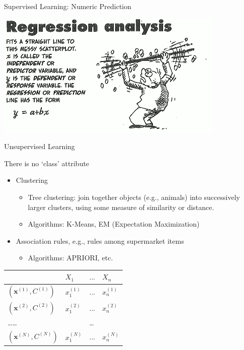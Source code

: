 \documentclass{beamer}
\begin{document}
\begin{frame}{Supervised Learning: Numeric Prediction}

\begin{center}
\includegraphics[width=.9\textwidth]{figs/regressionCarton}
\end{center}

\end{frame}

\begin{frame}{Unsupervised Learning}

There is no ‘class’ attribute

\begin{itemize}
 \item \alert{Clustering}
 \begin{itemize}
  \item Tree clustering: join together objects (e.g., animals) into successively larger clusters, using some measure of similarity or distance.
  \item Algorithms: K-Means, EM (Expectation Maximization)
 \end{itemize}

 \item \alert{Association rules}, e.g., rules among supermarket items
 \begin{itemize}
  \item Algorithms: APRIORI, etc.
 \end{itemize}

\end{itemize}


\begin{center}
\begin{tabular}{l|lll}
  & $X_1 $ & $\ldots$ & $X_n$  \\
  \hline
$(\mathbf{x}^{(1)}, C^{(1)})$ & $x^{(1)}_1$ & $\ldots$ & $x^{(1)}_n$ \\
$(\mathbf{x}^{(2)}, C^{(2)})$ & $x^{(2)}_1$ & $\ldots$ & $x^{(2)}_n$ \\
\ldots\ldots 	 &		& \ldots  &	\\	
$(\mathbf{x}^{(N)}, C^{(N)})$ & $x^{(N)}_1$ & $\ldots$ & $x^{(N)}_n$ \\
\end{tabular}
\end{center}

\end{frame}
\end{document}
